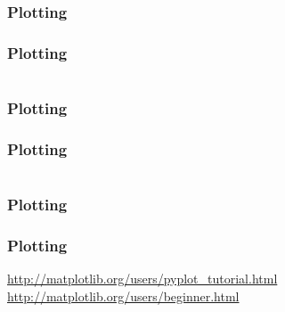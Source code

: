 \documentclass{formation}
\begin{document}
\begin{frame}
  \frametitle{Plotting}
\end{frame}

\begin{frame}
  \frametitle{Plotting}
  \inputminted[linenos,fontsize=\small]{python}{pyplot_5.py}
\end{frame}

\begin{frame}
  \frametitle{Plotting}
\end{frame}

\begin{frame}
  \frametitle{Plotting}
  \inputminted[linenos,fontsize=\small]{python}{pyplot_6.py}
\end{frame}

\begin{frame}
  \frametitle{Plotting}
\end{frame}


\begin{frame}
  \frametitle{Plotting}
    \url{http://matplotlib.org/users/pyplot_tutorial.html}
    \url{http://matplotlib.org/users/beginner.html}
\end{frame}
\end{document}
